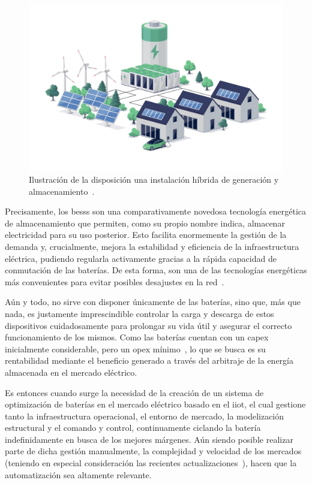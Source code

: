 \begin{figure}
  \centering
  \includegraphics[width=0.5\linewidth]{figures/instalacion-bess.jpg}
  \caption{Ilustración de la disposición una instalación híbrida de generación y almacenamiento~\cite{deutz2023what}.}
  \label{fig:instalacion-bess}
\end{figure}

Precisamente, los \glspl{bess} son una comparativamente novedosa tecnología energética de almacenamiento que permiten, como su propio nombre indica, almacenar electricidad para su uso posterior. Esto facilita enormemente la gestión de la demanda y, crucialmente, mejora la estabilidad y eficiencia de la infraestructura eléctrica, pudiendo regularla activamente gracias a la rápida capacidad de conmutación de las baterías. De esta forma, son una de las tecnologías energéticas más convenientes para evitar posibles desajustes en la red~\cite{xu2014bess}.

Aún y todo, no sirve con disponer únicamente de las baterías, sino que, más que nada, es justamente imprescindible controlar la carga y descarga de estos dispositivos cuidadosamente para prolongar su vida útil y asegurar el correcto funcionamiento de los mismos. Como las baterías cuentan con un \gls{capex} inicialmente considerable, pero un \gls{opex} mínimo~\cite{larsson2018cost}, lo que se busca es su rentabilidad mediante el beneficio generado a través del arbitraje de la energía almacenada en el mercado eléctrico.

Es entonces cuando surge la necesidad de la creación de un sistema de optimización de baterías en el mercado eléctrico basado en el \gls{iiot}, el cual gestione tanto la infraestructura operacional, el entorno de mercado, la modelización estructural y el comando y control, continuamente ciclando la batería indefinidamente en busca de los mejores márgenes. Aún siendo posible realizar parte de dicha gestión manualmente, la complejidad y velocidad de los mercados (teniendo en especial consideración las recientes actualizaciones~\cite{omie2025instruccion}), hacen que la automatización sea altamente relevante.

